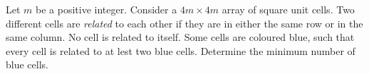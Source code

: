 Let $m$ be a positive integer. Consider a $4m\times 4m$ array of square unit cells. Two different cells are \emph{related} to each other if they are in either the same row or in the same column. No cell is related to itself. Some cells are coloured blue, such that every cell is related to at lest two blue cells. Determine the minimum number of blue cells.